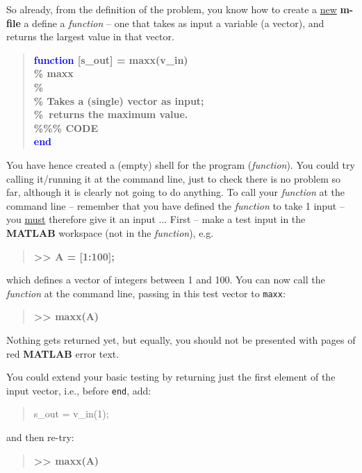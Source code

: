 \documentclass{tufte-book} %
\newenvironment{docspec}{\begin{quotation}\ttfamily\parskip0pt\parindent0pt\ignorespaces}{\end{quotation}}
\newenvironment{docspecbold}{\begin{quotation}\ttfamily\bfseries\parskip0pt\parindent0pt\ignorespaces}{\end{quotation}}
\begin{document}
So already, from the definition of the problem, you know how to create a \uline{new} \textbf{m-file} a define a \textit{function} -- one that takes as input a variable (a vector), and returns the largest value in that vector.
\begin{docspecbold}
\textcolor{blue}{function} [s\_out] = maxx(v\_in)\\
\textcolor[rgb]{0,0.501961,0}{\% maxx\\
\%\\
\% Takes a (single) vector as input;\\ \%\ returns the maximum value.}\\
\textcolor[rgb]{0,0.501961,0}{\%\%\% CODE} \\
\textcolor{blue}{end}
\end{docspecbold}
You have hence created a (empty) shell for the program (\textit{function}). You could try calling it/running it at the command line, just to check there is no problem so far, although it is clearly not going to do anything. To call your \textit{function} at the command line -- remember that you have defined the \textit{function} to take 1 input -- you \uline{must} therefore give it an input ... First -- make a test input in the \textbf{MATLAB} workspace (not in the \textit{function}), e.g.
\begin{docspecbold}
>> A = [1:100];
\end{docspecbold}
which defines a vector of integers between 1 and 100. You can now call the \textit{function} at the command line, passing in this test vector to \texttt{maxx}:
\begin{docspecbold}
>> maxx(A)
\end{docspecbold}
Nothing gets returned yet, but equally, you should not be presented with pages of red \textbf{MATLAB} error text.

You could extend your basic testing by returning just the first element of the input vector, i.e., before \texttt{end}, add:
\begin{docspec}
s\_out = v\_in(1);
\end{docspec}
and then re-try:
\begin{docspecbold}
>> maxx(A)
\end{docspecbold}
\end{document}
